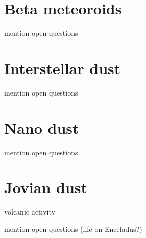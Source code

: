 \section{Beta meteoroids}

mention open questions

\section{Interstellar dust}

mention open questions

\section{Nano dust}

mention open questions

\section{Jovian dust}

volcanic activity

mention open questions (life on Enceladus?)


